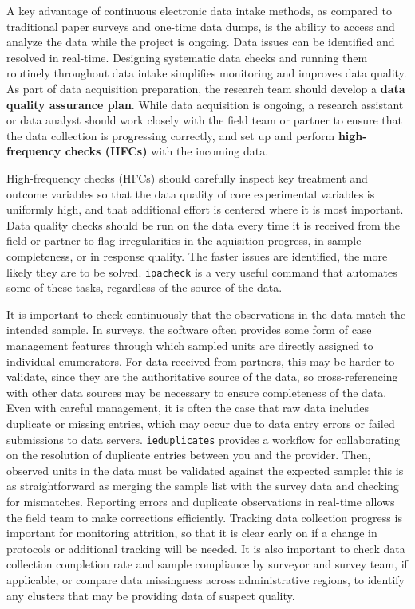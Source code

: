 A key advantage of continuous electronic data intake methods,
as compared to traditional paper surveys and one-time data dumps,
is the ability to access and analyze the data while the project is ongoing.
Data issues can be identified and resolved in real-time.
Designing systematic data checks and running them routinely throughout data intake
simplifies monitoring and improves data quality.
As part of data acquisition preparation,
the research team should develop a \textbf{data quality assurance plan}.
While data acquisition is ongoing,
a research assistant or data analyst should work closely with the field team or partner
to ensure that the data collection is progressing correctly,
and set up and perform \textbf{high-frequency checks (HFCs)} with the incoming data.

High-frequency checks (HFCs) should carefully inspect key treatment and outcome variables
so that the data quality of core experimental variables is uniformly high,
and that additional effort is centered where it is most important.
Data quality checks should be run on the data every time it is received from the field or partner
to flag irregularities in the aquisition progress, in sample completeness, or in response quality.
The faster issues are identified, the more likely they are to be solved.
\texttt{ipacheck}
is a very useful command that automates some of these tasks,
regardless of the source of the data.

It is important to check continuously that the observations in the data match the intended sample.
In surveys, the software often provides some form of case management features
through which sampled units are directly assigned to individual enumerators.
For data received from partners, this may be harder to validate,
since they are the authoritative source of the data,
so cross-referencing with other data sources may be necessary to ensure completeness of the data.
Even with careful management, it is often the case that raw data includes duplicate or missing entries,
which may occur due to data entry errors or failed submissions to data servers.
\texttt{ieduplicates}
provides a workflow for collaborating on the resolution of duplicate entries between you and the provider.
Then, observed units in the data must be validated against the expected sample:
this is as straightforward as merging the sample list with the survey data and checking for mismatches.
Reporting errors and duplicate observations in real-time allows the field team to make corrections efficiently.
Tracking data collection progress is important for monitoring attrition,
so that it is clear early on if a change in protocols or additional tracking will be needed.
It is also important to check data collection completion rate
and sample compliance by surveyor and survey team, if applicable,
or compare data missingness across administrative regions,
to identify any clusters that may be providing data of suspect quality.

